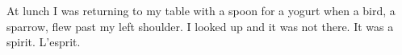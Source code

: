 

At lunch I was returning to my table with a spoon for a yogurt when a
bird, a sparrow, flew past my left shoulder.  I looked up and it was
not there.  It was a spirit.  L'esprit.

\bye
